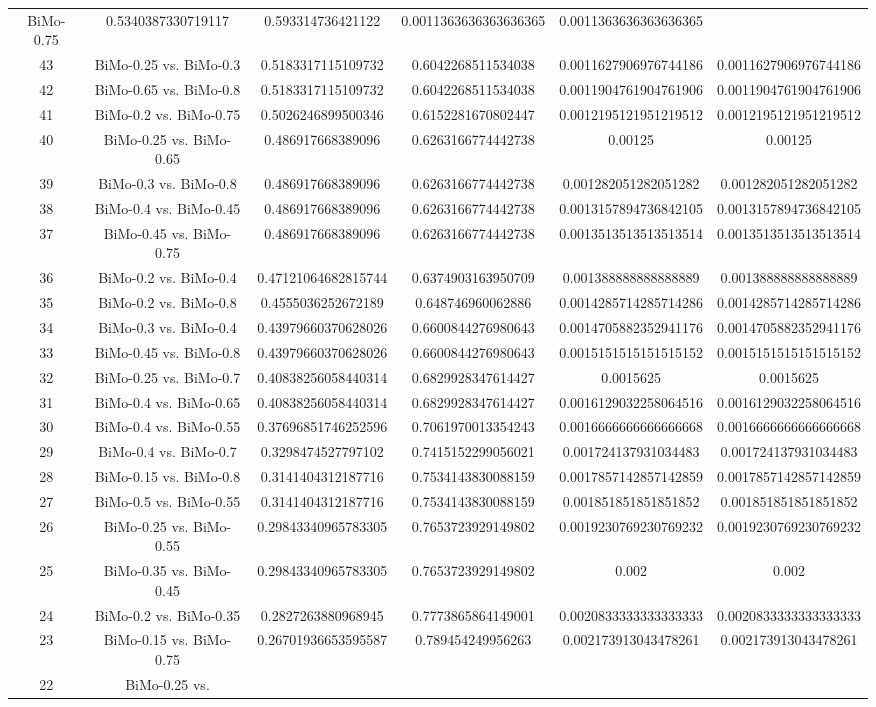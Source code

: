 \documentclass[a4paper,10pt]{article}
\begin{document}
\begin{landscape}
\begin{table}[!htp]
\begin{tabular}{cccccc}
BiMo-0.75&0.5340387330719117&0.593314736421122&0.0011363636363636365&0.0011363636363636365\\43&BiMo-0.25 vs. BiMo-0.3&0.5183317115109732&0.6042268511534038&0.0011627906976744186&0.0011627906976744186\\42&BiMo-0.65 vs. BiMo-0.8&0.5183317115109732&0.6042268511534038&0.0011904761904761906&0.0011904761904761906\\41&BiMo-0.2 vs. BiMo-0.75&0.5026246899500346&0.6152281670802447&0.0012195121951219512&0.0012195121951219512\\40&BiMo-0.25 vs. BiMo-0.65&0.486917668389096&0.6263166774442738&0.00125&0.00125\\39&BiMo-0.3 vs. BiMo-0.8&0.486917668389096&0.6263166774442738&0.001282051282051282&0.001282051282051282\\38&BiMo-0.4 vs. BiMo-0.45&0.486917668389096&0.6263166774442738&0.0013157894736842105&0.0013157894736842105\\37&BiMo-0.45 vs. BiMo-0.75&0.486917668389096&0.6263166774442738&0.0013513513513513514&0.0013513513513513514\\36&BiMo-0.2 vs. BiMo-0.4&0.47121064682815744&0.6374903163950709&0.001388888888888889&0.001388888888888889\\35&BiMo-0.2 vs. BiMo-0.8&0.4555036252672189&0.648746960062886&0.0014285714285714286&0.0014285714285714286\\34&BiMo-0.3 vs. BiMo-0.4&0.43979660370628026&0.6600844276980643&0.0014705882352941176&0.0014705882352941176\\33&BiMo-0.45 vs. BiMo-0.8&0.43979660370628026&0.6600844276980643&0.0015151515151515152&0.0015151515151515152\\32&BiMo-0.25 vs. BiMo-0.7&0.40838256058440314&0.6829928347614427&0.0015625&0.0015625\\31&BiMo-0.4 vs. BiMo-0.65&0.40838256058440314&0.6829928347614427&0.0016129032258064516&0.0016129032258064516\\30&BiMo-0.4 vs. BiMo-0.55&0.37696851746252596&0.7061970013354243&0.0016666666666666668&0.0016666666666666668\\29&BiMo-0.4 vs. BiMo-0.7&0.3298474527797102&0.7415152299056021&0.001724137931034483&0.001724137931034483\\28&BiMo-0.15 vs. BiMo-0.8&0.3141404312187716&0.7534143830088159&0.0017857142857142859&0.0017857142857142859\\27&BiMo-0.5 vs. BiMo-0.55&0.3141404312187716&0.7534143830088159&0.001851851851851852&0.001851851851851852\\26&BiMo-0.25 vs. BiMo-0.55&0.29843340965783305&0.7653723929149802&0.0019230769230769232&0.0019230769230769232\\25&BiMo-0.35 vs. BiMo-0.45&0.29843340965783305&0.7653723929149802&0.002&0.002\\24&BiMo-0.2 vs. BiMo-0.35&0.2827263880968945&0.7773865864149001&0.0020833333333333333&0.0020833333333333333\\23&BiMo-0.15 vs. BiMo-0.75&0.26701936653595587&0.789454249956263&0.002173913043478261&0.002173913043478261\\22&BiMo-0.25 vs. 
\end{tabular}
\end{table}
\end{landscape}
\end{document}
